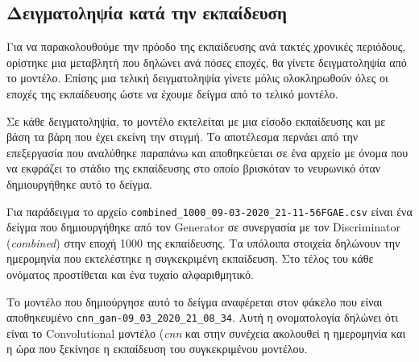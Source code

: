 \subsection{Δειγματοληψία κατά την εκπαίδευση}
Για να παρακολουθούμε την πρόοδο της εκπαίδευσης ανά τακτές χρονικές περιόδους, ορίστηκε μια μεταβλητή που δηλώνει ανά πόσες εποχές, θα γίνετε δειγματοληψία από το μοντέλο. Επίσης μια τελική δειγματοληψία γίνετε μόλις ολοκληρωθούν όλες οι εποχές της εκπαίδευσης ώστε να έχουμε δείγμα από το τελικό μοντέλο. 
\par
Σε κάθε δειγματοληψία, το μοντέλο εκτελείται με μια είσοδο εκπαίδευσης και με βάση τα βάρη που έχει εκείνη την στιγμή. Το αποτέλεσμα περνάει από την επεξεργασία που αναλύθηκε παραπάνω και αποθηκεύεται σε ένα αρχείο με όνομα που να εκφράζει το στάδιο της εκπαίδευσης στο οποίο βρισκόταν το νευρωνικό όταν δημιουργήθηκε αυτό το δείγμα.
\par
Για παράδειγμα το αρχείο \verb|combined_1000_09-03-2020_21-11-56FGAE.csv| είναι ένα δείγμα που δημιουργήθηκε από τον Generator σε συνεργασία με τον Discriminator (\textit{combined}) στην εποχή 1000 της εκπαίδευσης. Τα υπόλοιπα στοιχεία δηλώνουν την ημερομηνία που εκτελέστηκε η συγκεκριμένη εκπαίδευση. Στο τέλος του κάθε ονόματος προστίθεται και ένα τυχαίο αλφαριθμητικό. 
\par
Το μοντέλο που δημιούργησε αυτό το δείγμα αναφέρεται στον φάκελο που είναι αποθηκευμένο \verb|cnn_gan-09_03_2020_21_08_34|. Αυτή η ονοματολογία δηλώνει ότι είναι το Convolutional μοντέλο (\textit{cnn} και στην συνέχεια ακολουθεί η ημερομηνία και η ώρα που ξεκίνησε η εκπαίδευση του συγκεκριμένου μοντέλου.

